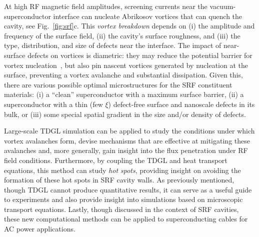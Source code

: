 \documentclass[%
 aip,
 amsmath,amssymb,
 reprint,%
floatfix]{revtex4-1}
\begin{document}
At high RF magnetic field amplitudes, screening currents near the vacuum-superconductor interface can nucleate Abrikosov vortices that can quench the cavity, see Fig.~\ref{fig:srf}c. This \emph{vortex breakdown} depends on (i) the amplitude and frequency of the surface field, (ii) the cavity's surface roughness, and (iii) the type, distribution, and size of defects near the interface. The impact of near-surface defects on vortices is diametric: they may reduce the potential barrier for vortex nucleation~\cite{kimmel2019}, but also pin nascent vortices generated by nucleation at the surface, preventing a vortex avalanche and substantial dissipation.  Given this, there are various possible optimal microstructures for the SRF constituent materials: (i) a ``clean'' superconductor with a maximum surface barrier, (ii) a superconductor with a thin (few $\xi$) defect-free surface and nanoscale defects in its bulk, or (iii) some special spatial gradient in the size and/or density of defects.



Large-scale TDGL simulation can be applied to study the conditions under which vortex avalanches form, devise mechanisms that are effective at mitigating these avalanches and, more generally, gain insight into the flux penetration under RF field conditions.  Furthermore, by coupling the TDGL and heat transport equations, this method can study \emph{hot spots}, providing insight on avoiding the formation of these hot spots in SRF cavity walls. As previously mentioned, though TDGL cannot produce quantitative results, it can serve as a useful guide to experiments and also provide insight into simulations based on microscopic transport equations. Lastly, though discussed in the context of SRF cavities, these new computational methods can be applied to superconducting cables for AC power applications. 
\end{document}
